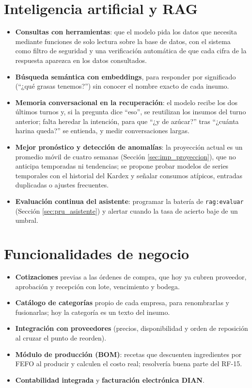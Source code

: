 \section{Inteligencia artificial y RAG}
\begin{itemize}
    \item \textbf{Consultas con herramientas}: que el modelo pida los datos que necesita mediante funciones de solo lectura sobre la base de datos, con el sistema como filtro de seguridad y una verificación automática de que cada cifra de la respuesta aparezca en los datos consultados.
    \item \textbf{Búsqueda semántica con embeddings}, para responder por significado (``¿qué grasas tenemos?'') sin conocer el nombre exacto de cada insumo.
    \item \textbf{Memoria conversacional en la recuperación}: el modelo recibe los dos últimos turnos y, si la pregunta dice ``eso'', se reutilizan los insumos del turno anterior; falta heredar la intención, para que ``¿y de azúcar?'' tras ``¿cuánta harina queda?'' se entienda, y medir conversaciones largas.
    \item \textbf{Mejor pronóstico y detección de anomalías}: la proyección actual es un promedio móvil de cuatro semanas (Sección \ref{sec:imp_proyeccion}), que no anticipa temporadas ni tendencias; se propone probar modelos de series temporales con el historial del Kardex y señalar consumos atípicos, entradas duplicadas o ajustes frecuentes.
    \item \textbf{Evaluación continua del asistente}: programar la batería de \texttt{rag:evaluar} (Sección \ref{sec:pru_asistente}) y alertar cuando la tasa de acierto baje de un umbral.
\end{itemize}

\section{Funcionalidades de negocio}
\begin{itemize}
    \item \textbf{Cotizaciones} previas a las órdenes de compra, que hoy ya cubren proveedor, aprobación y recepción con lote, vencimiento y bodega.
    \item \textbf{Catálogo de categorías} propio de cada empresa, para renombrarlas y fusionarlas; hoy la categoría es un texto del insumo.
    \item \textbf{Integración con proveedores} (precios, disponibilidad y orden de reposición al cruzar el punto de reorden).
    \item \textbf{Módulo de producción (BOM)}: recetas que descuenten ingredientes por FEFO al producir y calculen el costo real; resolvería buena parte del RF-15.
    \item \textbf{Contabilidad integrada} y \textbf{facturación electrónica DIAN}.
\end{itemize}


